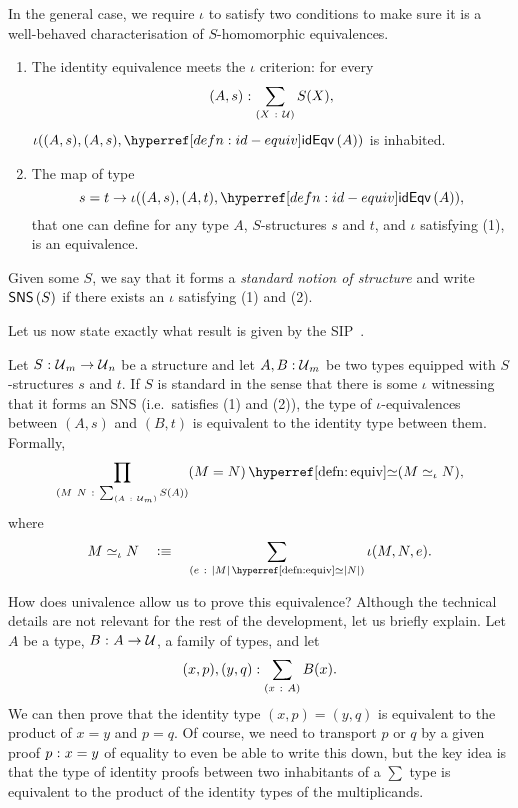 In the general case, we require $\iota$ to satisfy two conditions to make sure it is a
well-behaved characterisation of $S$-homomorphic equivalences.
\begin{enumerate}
  \item The identity equivalence meets the $\iota$ criterion: for every $$(A,
    s)\hspace{0.1mm}:\hspace{0.1mm}\sum_{(X~:~\mathcal{U}{})} S(X),$$ $\iota((A, s), (A, s), \idequiv{A})$ is inhabited.
  \item The map of type
    \begin{equation*}
      s = t \rightarrow \iota((A, s), (A, t), \idequiv{A}),
    \end{equation*}
    that one can define for any type $A$, $S$-structures $s$ and $t$, and $\iota$ satisfying
    (1), is an equivalence.
\end{enumerate}

Given some $S$, we say that it forms a \emph{standard notion of structure} and write
$\mathsf{SNS}\left(S\right)$ if there exists an $\iota$ satisfying (1) and (2).

Let us now state exactly what result is given by the
SIP~\cite{escardo-uf-intro, agda-cubical}.
\begin{defn}
  Let $S\hspace{0.1mm}:\hspace{0.1mm}\mathcal{U}{}_m \rightarrow \mathcal{U}{}_n$ be a structure and let $A, B:\mathcal{U}{}_m$
  be two types equipped with $S$-structures $s$ and $t$. If $S$ is standard in the sense
  that there is some $\iota$ witnessing that it forms an SNS (i.e.~satisfies (1) and (2)), the
  type of $\iota$-equivalences between $(A, s)$ and $(B, t)$ is equivalent to the identity
  type between them. Formally,
  \begin{equation*}
    \pity{M~N}{\sigmaty{A}{\univ{}_m}{S(A)}}{\typequiv{(M = N)}{(M \simeq_{\iota} N)}},
  \end{equation*}
  where
  \begin{equation*}
    M \simeq_{\iota} N \quad\is\quad \sigmaty{e}{\typequiv{\abs{M}}{\abs{N}}}{\iota(M, N, e)}.
  \end{equation*}
\end{defn}

How does univalence allow us to prove this equivalence? Although the technical details are
not relevant for the rest of the development, let us briefly explain. Let $A$ be a type,
$B\hspace{0.1mm}:\hspace{0.1mm}A \rightarrow \mathcal{U}{}$, a family of types, and let
\begin{equation*}
  (x, p), (y, q):\sum_{(x~:~A)} B(x).
\end{equation*}
We can then prove that the identity type $(x , p) = (y , q)$ is equivalent to the product
of $x = y$ and $p = q$. Of course, we need to transport $p$ or $q$ by a given proof
$p\hspace{0.1mm}:\hspace{0.1mm}x = y$ of equality to even be able to write this down, but the key idea is
that the type of identity proofs between two inhabitants of a $\sum$ type is equivalent to
the product of the identity types of the multiplicands.

